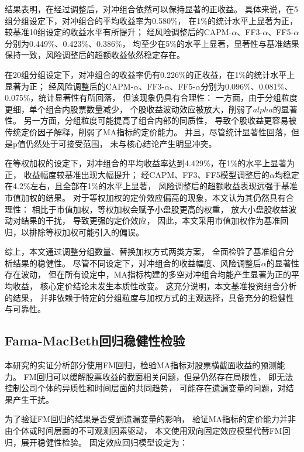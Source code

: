 结果表明，在经过调整后，对冲组合依然可以保持显著的正收益。
具体来说，在5组分组设定下，对冲组合的平均收益率为0.580\%，
在1\%的统计水平上显著为正，较基准10组设定的收益水平有所提升；
经风险调整后的CAPM-$\alpha$、FF3-$\alpha$、FF5-$\alpha$分别为0.449\%、0.423\%、0.386\%，
均至少在5\%的水平上显著，显著性与基准结果保持一致，风险调整后的超额收益依然稳定存在。

在20组分组设定下，对冲组合的收益率仍有0.226\%的正收益，在1\%的统计水平上显著为正；
经风险调整后的CAPM-$\alpha$、FF3-$\alpha$、FF5-$\alpha$分别为0.096\%、0.081\%、0.075\%，统计显著性有所回落，
但该现象仍具有合理性：
一方面，由于分组粒度更细，单个组合内股票数量减少，
个股收益波动效应被放大，削弱了$alpha$的显著性。
另一方面，分组粒度可能提高了组合内部的同质性，
导致个股收益更容易被传统定价因子解释，削弱了MA指标的定价能力。
并且，尽管统计显著性回落，但是p值仍然处于可接受范围，
未与核心结论产生明显冲突。

在等权加权的设定下，对冲组合的平均收益率达到4.429\%，在1\%的水平上显著为正，
收益幅度较基准出现大幅提升；
经CAPM、FF3、FF5模型调整后的$\alpha$均稳定在4.2\%左右，且全部在1\%的水平上显著，
风险调整后的超额收益表现远强于基准市值加权的结果。
对于等权加权的定价效应偏高的现象，本文认为其仍然具有合理性：
相比于市值加权，等权加权会赋予小盘股更高的权重，
放大小盘股收益波动对结果的干扰，
导致更强的定价效应，
因此，本文采用市值加权作为基准回归，以排除等权加权可能引入的偏误。

综上，本文通过调整分组数量、替换加权方式两类方案，
全面检验了基准组合分析结果的稳健性。
尽管不同设定下，对冲组合的收益幅度、风险调整后$\alpha$的显著性存在波动，
但在所有设定中，MA指标构建的多空对冲组合均能产生显著为正的平均收益，
核心定价结论未发生本质性改变。
这充分说明，本文基准投资组合分析的结果，
并非依赖于特定的分组粒度与加权方式的主观选择，具备充分的稳健性与可靠性。

\FloatBarrier

\subsection{Fama-MacBeth回归稳健性检验}  
本研究的实证分析部分使用FM回归，检验MA指标对股票横截面收益的预测能力。
FM回归可以缓解股票收益的截面相关问题，但是仍然存在局限性，
即无法控制公司个体的异质性和时间层面的共同趋势，
可能存在遗漏变量的问题，对结果产生干扰。

为了验证FM回归的结果是否受到遗漏变量的影响，
验证MA指标的定价能力并非由个体或时间层面的不可观测因素驱动，
本文使用双向固定效应模型代替FM回归，展开稳健性检验。
固定效应回归模型设定为：

